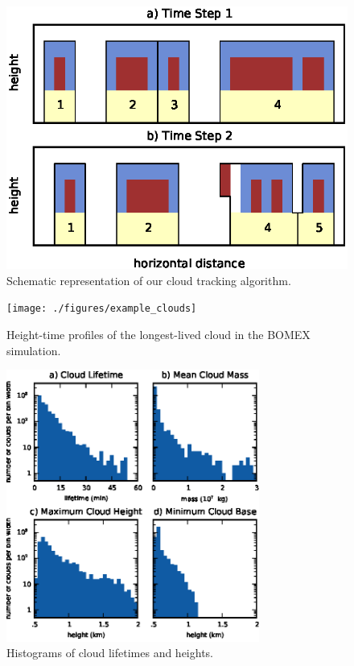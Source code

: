 \documentclass[acp]{copernicus}
\begin{document}
\begin{figure}[t]
\vspace*{2mm}
\begin{center}
\includegraphics[width=\textwidth]{./figures/cloudfinder_instructions}
\end{center}
\caption{Schematic representation of our cloud tracking algorithm.}
\label{fig:cloudfinder_instructions}
\end{figure}

\begin{figure}[t]
\vspace*{2mm}
\begin{center}
\texttt{[image: ./figures/example\_clouds]}
\end{center}
\caption{Height-time profiles of the longest-lived cloud in the BOMEX 
simulation.}
\label{fig:example_clouds}
\end{figure}

\begin{figure}[t]
\vspace*{2mm}
\begin{center}
\includegraphics[width=8.3cm]{./figures/cloud_stats}
\end{center}
\caption{Histograms of cloud lifetimes and heights.}
\label{fig:cloud_stats}
\end{figure}
\end{document}
